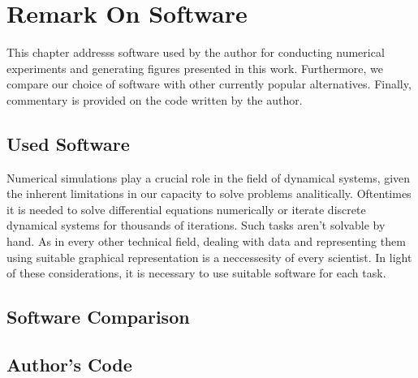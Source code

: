 \chapter{Remark On Software}
\label{sec:software_remark}

This chapter addresss software used by the author for conducting numerical experiments and generating figures presented in this work.
Furthermore, we compare our choice of software with other currently popular alternatives.
Finally, commentary is provided on the code written by the author.

\section{Used Software}
Numerical simulations play a crucial role in the field of dynamical systems, given the inherent limitations in our capacity to solve problems analitically.
Oftentimes it is needed to solve differential equations numerically or iterate discrete dynamical systems for thousands of iterations.
Such tasks aren't solvable by hand.
As in every other technical field, dealing with data and representing them using suitable graphical representation is a neccessesity of every scientist.
In light of these considerations, it is necessary to use suitable software for each task.
\par


\section{Software Comparison}

\section{Author's Code}

\endinput